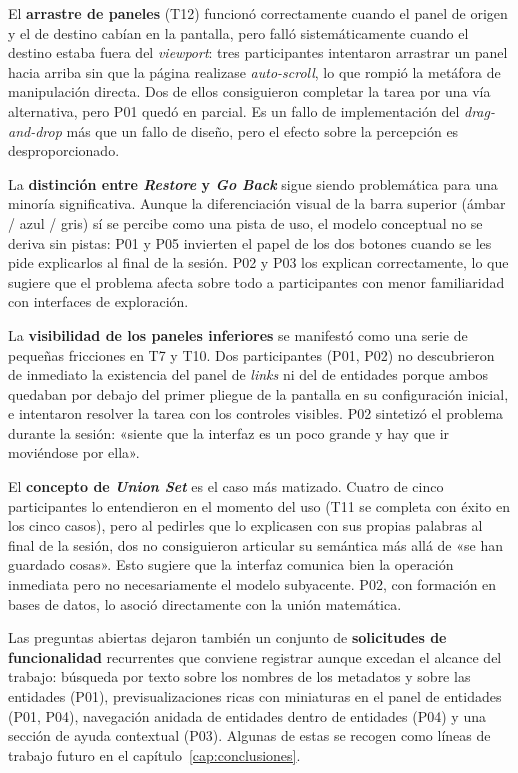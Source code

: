 El \textbf{arrastre de paneles} (T12) funcionó correctamente cuando el panel de origen y
el de destino cabían en la pantalla, pero falló sistemáticamente cuando el destino estaba
fuera del \textit{viewport}: tres participantes intentaron arrastrar un panel hacia arriba
sin que la página realizase \textit{auto-scroll}, lo que rompió la metáfora de manipulación
directa. Dos de ellos consiguieron completar la tarea por una vía alternativa, pero P01
quedó en parcial. Es un fallo de implementación del \textit{drag-and-drop} más que un fallo
de diseño, pero el efecto sobre la percepción es desproporcionado.

La \textbf{distinción entre \textit{Restore} y \textit{Go Back}} sigue siendo problemática
para una minoría significativa. Aunque la diferenciación visual de la barra superior
(ámbar / azul / gris) sí se percibe como una pista de uso, el modelo conceptual no se
deriva sin pistas: P01 y P05 invierten el papel de los dos botones cuando se les pide
explicarlos al final de la sesión. P02 y P03 los explican correctamente, lo que sugiere
que el problema afecta sobre todo a participantes con menor familiaridad con interfaces
de exploración.

La \textbf{visibilidad de los paneles inferiores} se manifestó como una serie de pequeñas
fricciones en T7 y T10. Dos participantes (P01, P02) no descubrieron de inmediato la
existencia del panel de \textit{links} ni del de entidades porque ambos quedaban por debajo
del primer pliegue de la pantalla en su configuración inicial, e intentaron resolver la
tarea con los controles visibles. P02 sintetizó el problema durante la sesión: «siente
que la interfaz es un poco grande y hay que ir moviéndose por ella».

El \textbf{concepto de \textit{Union Set}} es el caso más matizado. Cuatro de cinco
participantes lo entendieron en el momento del uso (T11 se completa con éxito en los
cinco casos), pero al pedirles que lo explicasen con sus propias palabras al final de la
sesión, dos no consiguieron articular su semántica más allá de «se han guardado cosas».
Esto sugiere que la interfaz comunica bien la operación inmediata pero no necesariamente
el modelo subyacente. P02, con formación en bases de datos, lo asoció directamente con la
unión matemática.

Las preguntas abiertas dejaron también un conjunto de \textbf{solicitudes de funcionalidad}
recurrentes que conviene registrar aunque excedan el alcance del trabajo: búsqueda por
texto sobre los nombres de los metadatos y sobre las entidades (P01), previsualizaciones
ricas con miniaturas en el panel de entidades (P01, P04), navegación anidada de entidades
dentro de entidades (P04) y una sección de ayuda contextual (P03). Algunas de estas se
recogen como líneas de trabajo futuro en el capítulo~\ref{cap:conclusiones}.

